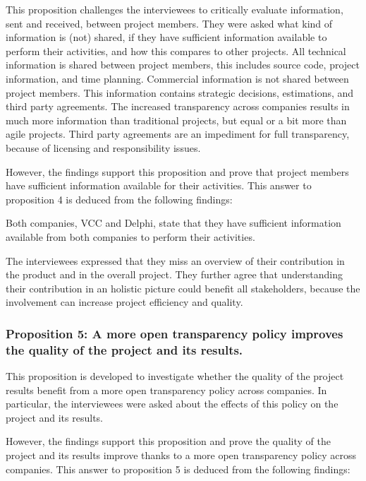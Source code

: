 This proposition challenges the interviewees to critically evaluate information, sent and received, between project members. They were asked what kind of information is (not) shared, if they have sufficient information available to perform their activities, and how this compares to other projects. All technical information is shared between project members, this includes source code, project information, and time planning. Commercial information is not shared between project members. This information contains strategic decisions, estimations, and third party agreements. The increased transparency across companies results in much more information than traditional projects, but equal or a bit more than agile projects. Third party agreements are an impediment for full transparency, because of licensing and responsibility issues.

However, the findings support this proposition and prove that project members have sufficient information available for their activities. This answer to proposition 4 is deduced from the following findings:

 Both companies, VCC and Delphi, state that they have sufficient information available from both companies to perform their activities. 

 The interviewees expressed that they miss an overview of their contribution in the product and in the overall project. They further agree that understanding their contribution in an holistic picture could benefit all stakeholders, because the involvement can increase project efficiency and quality.

\subsubsection{Proposition 5: A more open transparency policy improves the quality of the project and its results.}

This proposition is developed to investigate whether the quality of the project results benefit from a more open transparency policy across companies. In particular, the interviewees were asked about the effects of this policy on the project and its results.

However, the findings support this proposition and prove the quality of the project and its results improve thanks to a more open transparency policy across companies. This answer to proposition 5 is deduced from the following findings:

